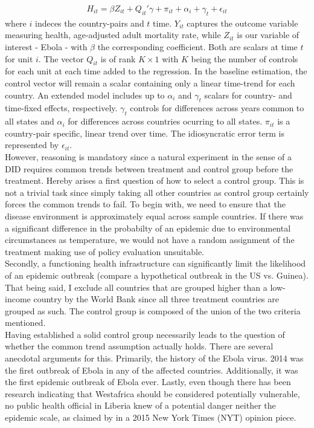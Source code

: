 \documentclass{article}
\begin{document}
\begin{align}
H_{it} =  \beta Z_{it} +  Q_{it}'\gamma + \pi_{it} + \alpha_i + \gamma_t + \epsilon_{it}
\end{align}
where $i$ indeces the country-pairs and $t$ time. $Y_{it}$ captures the outcome variable measuring health, age-adjusted adult mortality rate, while $Z_{it}$ is our variable of interest - Ebola - with $\beta$ the corresponding coefficient. Both are scalars at time $t$ for unit $i$. The vector $Q_{it}$ is of rank $K \times 1$ with $K$ being the number of controls for each unit at each time added to the regression. In the baseline estimation, the control vector will remain a scalar containing only a linear time-trend for each country. An extended model includes up to  $\alpha_i$ and $\gamma_t$ scalars for country- and time-fixed effects, respectively. $\gamma_t$ controls for differences across years common to all states and $\alpha_i$ for differences across countries ocurring to all states. $\pi_{it}$ is a country-pair specific, linear trend over time. The idiosyncratic error term is represented by $\epsilon_{it}$. \\
However, reasoning is mandatory since a natural experiment in the sense of a DID requires common trends between treatment and control group before the treatment. Hereby arises a first question of how to select a control group. This is not a trivial task since simply taking all other countries as control group certainly forces the common trends to fail. To begin with, we need to ensure that the disease environment is approximately equal across sample countries. If there was a significant difference in the probabilty of an epidemic due to environmental circumstances as temperature, we would not have a random assignment of the treatment making use of policy evaluation unsuitable.\\
Secondly, a functioning health infrastructure can significantly limit the likelihood of an epidemic outbreak (compare a hypothetical outbreak in the US vs. Guinea). That being said, I exclude all countries that are grouped higher than a low-income country by the World Bank since all three treatment countries are grouped as such. The control group is composed of the union of the two criteria mentioned.\\
Having established a solid control group necessarily leads to the question of whether the common trend assumption actually holds. There are several anecdotal arguments for this. Primarily, the history of the Ebola virus. 2014 was the first outbreak of Ebola in any of the affected countries. Additionally, it was the first epidemic outbreak of Ebola ever. Lastly, even though there has been research indicating that Westafrica should be considered potentially vulnerable, no public health official in Liberia knew of a potential danger neither the epidemic scale, as claimed by \cite{ebola2015nyt} in a 2015 New York Times (NYT) opinion piece.
\end{document}
